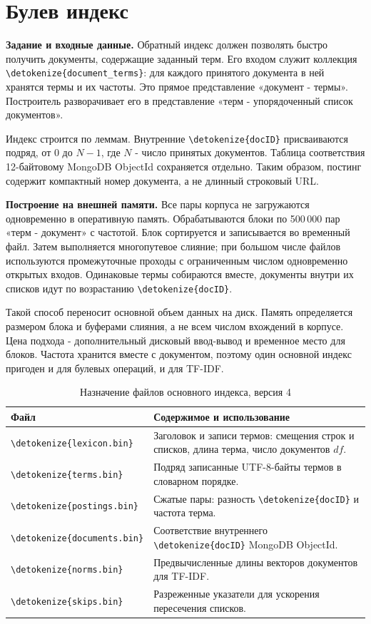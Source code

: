 \documentclass[pdf,unicode,12pt,a4paper,oneside,fleqn]{article}
\newcommand{\labsection}[2]{\par\Needspace{9\baselineskip}\setcounter{section}{\numexpr#1-1\relax}\section{#2}}
\newcommand{\partlabel}[1]{\par\Needspace{4\baselineskip}\medskip\textbf{#1.}\quad}
\DeclareRobustCommand{\code}[1]{\expandafter\nolinkurl\expandafter{\detokenize{#1}}}
\begin{document}
\labsection{7}{Булев индекс}

\partlabel{Задание и входные данные}
Обратный индекс должен позволять быстро получить документы, содержащие заданный
терм. Его входом служит коллекция \code{document_terms}: для каждого принятого
документа в ней хранятся термы и их частоты. Это прямое представление
«документ - термы». Построитель разворачивает его в представление
«терм - упорядоченный список документов».

Индекс строится по леммам. Внутренние \code{docID} присваиваются подряд,
от 0 до $N-1$, где $N$ - число принятых документов. Таблица соответствия
12-байтовому MongoDB ObjectId сохраняется отдельно. Таким образом,
постинг содержит компактный номер документа, а не длинный строковый URL.

\partlabel{Построение на внешней памяти}
Все пары корпуса не загружаются одновременно в оперативную память.
Обрабатываются блоки по 500\,000 пар «терм - документ» с частотой.
Блок сортируется и записывается во временный файл. Затем выполняется
многопутевое слияние; при большом числе файлов используются промежуточные
проходы с ограниченным числом одновременно открытых входов. Одинаковые термы
собираются вместе, документы внутри их списков идут по возрастанию \code{docID}.

Такой способ переносит основной объем данных на диск. Память определяется
размером блока и буферами слияния, а не всем числом вхождений в корпусе.
Цена подхода - дополнительный дисковый ввод-вывод и временное место для блоков.
Частота хранится вместе с документом, поэтому один основной индекс пригоден
и для булевых операций, и для TF-IDF.

\begin{table}[htbp]\centering
\caption{Назначение файлов основного индекса, версия 4}
\begin{tabularx}{\textwidth}{lY}
\toprule
Файл & Содержимое и использование\\
\midrule
\code{lexicon.bin} & Заголовок и записи термов: смещения строк и списков,
длина терма, число документов $df$.\\
\code{terms.bin} & Подряд записанные UTF-8-байты термов в словарном порядке.\\
\code{postings.bin} & Сжатые пары: разность \code{docID} и частота терма.\\
\code{documents.bin} & Соответствие внутреннего \code{docID} MongoDB ObjectId.\\
\code{norms.bin} & Предвычисленные длины векторов документов для TF-IDF.\\
\code{skips.bin} & Разреженные указатели для ускорения пересечения списков.\\
\bottomrule
\end{tabularx}
\end{table}
\end{document}
